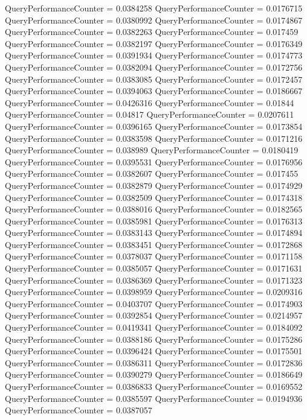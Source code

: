 \documentclass[9pt]{article}
\theoremstyle{plain}
\theoremstyle{definition}
\theoremstyle{remark}
\numberwithin{equation}{section}
\begin{document}
QueryPerformanceCounter  =  0.0384258
QueryPerformanceCounter  =  0.0176715
QueryPerformanceCounter  =  0.0380992
QueryPerformanceCounter  =  0.0174867
QueryPerformanceCounter  =  0.0382263
QueryPerformanceCounter  =  0.017459
QueryPerformanceCounter  =  0.0382197
QueryPerformanceCounter  =  0.0176349
QueryPerformanceCounter  =  0.0391934
QueryPerformanceCounter  =  0.0174773
QueryPerformanceCounter  =  0.0382094
QueryPerformanceCounter  =  0.0172756
QueryPerformanceCounter  =  0.0383085
QueryPerformanceCounter  =  0.0172457
QueryPerformanceCounter  =  0.0394063
QueryPerformanceCounter  =  0.0186667
QueryPerformanceCounter  =  0.0426316
QueryPerformanceCounter  =  0.01844
QueryPerformanceCounter  =  0.04817
QueryPerformanceCounter  =  0.0207611
QueryPerformanceCounter  =  0.0396165
QueryPerformanceCounter  =  0.0173854
QueryPerformanceCounter  =  0.0383598
QueryPerformanceCounter  =  0.0171216
QueryPerformanceCounter  =  0.038989
QueryPerformanceCounter  =  0.0180419
QueryPerformanceCounter  =  0.0395531
QueryPerformanceCounter  =  0.0176956
QueryPerformanceCounter  =  0.0382607
QueryPerformanceCounter  =  0.017455
QueryPerformanceCounter  =  0.0382879
QueryPerformanceCounter  =  0.0174929
QueryPerformanceCounter  =  0.0382509
QueryPerformanceCounter  =  0.0174318
QueryPerformanceCounter  =  0.0388016
QueryPerformanceCounter  =  0.0182565
QueryPerformanceCounter  =  0.0385981
QueryPerformanceCounter  =  0.0176313
QueryPerformanceCounter  =  0.0383143
QueryPerformanceCounter  =  0.0174894
QueryPerformanceCounter  =  0.0383451
QueryPerformanceCounter  =  0.0172868
QueryPerformanceCounter  =  0.0378037
QueryPerformanceCounter  =  0.0171158
QueryPerformanceCounter  =  0.0385057
QueryPerformanceCounter  =  0.0171631
QueryPerformanceCounter  =  0.0386369
QueryPerformanceCounter  =  0.0171323
QueryPerformanceCounter  =  0.0398959
QueryPerformanceCounter  =  0.0209316
QueryPerformanceCounter  =  0.0403707
QueryPerformanceCounter  =  0.0174903
QueryPerformanceCounter  =  0.0392854
QueryPerformanceCounter  =  0.0214957
QueryPerformanceCounter  =  0.0419341
QueryPerformanceCounter  =  0.0184092
QueryPerformanceCounter  =  0.0388186
QueryPerformanceCounter  =  0.0175286
QueryPerformanceCounter  =  0.0396424
QueryPerformanceCounter  =  0.0175501
QueryPerformanceCounter  =  0.0386311
QueryPerformanceCounter  =  0.0172836
QueryPerformanceCounter  =  0.0390279
QueryPerformanceCounter  =  0.0186649
QueryPerformanceCounter  =  0.0386833
QueryPerformanceCounter  =  0.0169552
QueryPerformanceCounter  =  0.0385597
QueryPerformanceCounter  =  0.0194936
QueryPerformanceCounter  =  0.0387057
\end{document}
